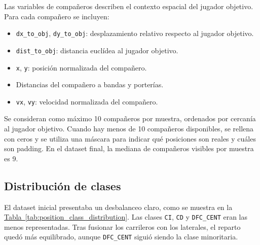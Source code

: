 Las variables de compañeros describen el contexto espacial del jugador objetivo. Para cada compañero se incluyen:

\begin{itemize}
    \item \texttt{dx\_to\_obj}, \texttt{dy\_to\_obj}: desplazamiento relativo respecto al jugador objetivo.
    \item \texttt{dist\_to\_obj}: distancia euclídea al jugador objetivo.
    \item \texttt{x}, \texttt{y}: posición normalizada del compañero.
    \item Distancias del compañero a bandas y porterías.
    \item \texttt{vx}, \texttt{vy}: velocidad normalizada del compañero.
\end{itemize}

Se consideran como máximo 10 compañeros por muestra, ordenados por cercanía al jugador objetivo. Cuando hay menos de 10 compañeros disponibles, se rellena con ceros y se utiliza una máscara para indicar qué posiciones son reales y cuáles son padding. En el dataset final, la mediana de compañeros visibles por muestra es 9.

\subsection{Distribución de clases}

El dataset inicial presentaba un desbalanceo claro, como se muestra en la \hyperref[tab:position_class_distribution]{Tabla~\ref*{tab:position_class_distribution}}. Las clases \texttt{CI}, \texttt{CD} y \texttt{DFC\_CENT} eran las menos representadas. Tras fusionar los carrileros con los laterales, el reparto quedó más equilibrado, aunque \texttt{DFC\_CENT} siguió siendo la clase minoritaria.

